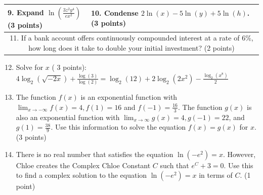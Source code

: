 \documentclass[10pt]{article}
\begin{document}
\begin{center}
\begin{tabular}{|l|l|}
\hline
9. Expand $\ln \left(\frac{3 z^{2} y^{4}}{e x^{2}}\right)$ (3 points) & 10. Condense $2 \ln (x)-5 \ln (y)+5 \ln (h)$. (3 points) \\
\hline
\multicolumn{2}{|c|}{11. If a bank account offers continuously compounded interest at a rate of $6 \%$, how long does it take to double your initial investment? (2 points)} \\
\hline
\end{tabular}
\end{center}

\begin{enumerate}
  \setcounter{enumi}{11}
  \item Solve for $x$ ( 3 points): $4 \log _{2}(\sqrt{-2 x})+\frac{\log (3)}{\log (2)}=\log _{2}(12)+2 \log _{2}\left(2 x^{2}\right)-\frac{\log _{2}\left(x^{8}\right)}{2}$
  \item The function $f(x)$ is an exponential function with $\lim _{x \rightarrow-\infty} f(x)=4, f(1)=16$ and $f(-1)=\frac{16}{3}$. The function $g(x)$ is also an exponential function with $\lim _{x \rightarrow \infty} g(x)=4, g(-1)=22$, and $g(1)=\frac{38}{9}$. Use this information to solve the equation $f(x)=g(x)$ for $x$. (3 points)
  \item There is no real number that satisfies the equation $\ln \left(-e^{2}\right)=x$. However, Chloe creates the Complex Chloe Constant $C$ such that $e^{C}+3=0$. Use this to find a complex solution to the equation $\ln \left(-e^{2}\right)=x$ in terms of $C$. (1 point)
\end{enumerate}
\end{document}
